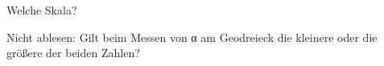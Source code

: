 \setcounter{aufgabe}{7}

\begin{aufgabe}{Welche Skala?}
\begin{teile}
\teil Nicht ablesen: Gilt beim Messen von α am Geodreieck die kleinere oder die größere der beiden Zahlen? \\  \\ 

\end{teile}
\end{aufgabe}

